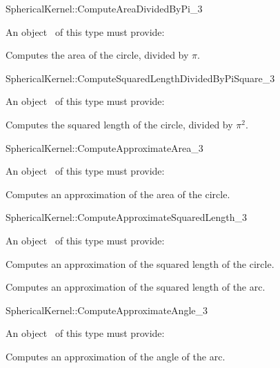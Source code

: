 \begin{ccRefFunctionObjectConcept}{SphericalKernel::ComputeAreaDividedByPi_3}

An object \ccVar\ of this type must provide:

{Computes the area of the circle, divided by $\pi$.}

\end{ccRefFunctionObjectConcept}
\begin{ccRefFunctionObjectConcept}{SphericalKernel::ComputeSquaredLengthDividedByPiSquare_3}

An object \ccVar\ of this type must provide:

{Computes the squared length of the circle, divided by $\pi^2$.}

\end{ccRefFunctionObjectConcept}
\begin{ccRefFunctionObjectConcept}{SphericalKernel::ComputeApproximateArea_3}

An object \ccVar\ of this type must provide:

{Computes an approximation of the area of the circle.}

\end{ccRefFunctionObjectConcept}
\begin{ccRefFunctionObjectConcept}{SphericalKernel::ComputeApproximateSquaredLength_3}

An object \ccVar\ of this type must provide:

{Computes an approximation of the squared length of the circle.}

{Computes an approximation of the squared length of the arc.}

\end{ccRefFunctionObjectConcept}
\begin{ccRefFunctionObjectConcept}{SphericalKernel::ComputeApproximateAngle_3}

An object \ccVar\ of this type must provide:

{Computes an approximation of the angle of the arc.}

\end{ccRefFunctionObjectConcept}
